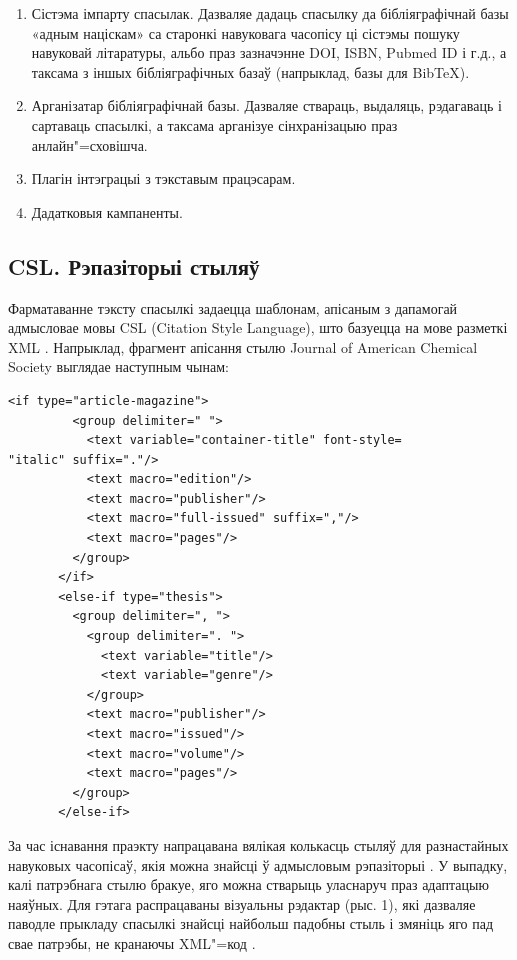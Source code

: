 \documentclass[10pt, a5paper]{article}
\begin{document}
\begin{enumerate}
  \item Сістэма імпарту спасылак. Дазваляе дадаць спасылку да бібліяграфічнай базы «адным націскам» са старонкі навуковага часопісу ці сістэмы пошуку навуковай літаратуры, альбо праз зазначэнне DOI, ISBN, Pubmed ID і г.д., а таксама з іншых бібліяграфічных базаў (напрыклад, базы для BibTeX).
  \item Арганізатар бібліяграфічнай базы. Дазваляе ствараць, выдаляць, рэдагаваць і сартаваць спасылкі, а таксама арганізуе сінхранізацыю праз анлайн"=сховішча.
  \item Плагін інтэграцыі з тэкставым працэсарам.
  \item Дадатковыя кампаненты.
\end{enumerate}

\subsection*{CSL. Рэпазіторыі стыляў}

Фарматаванне тэксту спасылкі задаецца шаблонам, апісаным з дапамогай адмысловае мовы CSL (Citation Style Language), што базуецца на мове разметкі XML \cite{Litvinenko1}. Напрыклад, фрагмент апісання стылю Journal of American Chemical Society выглядае наступным чынам:

\begin{verbatim}
<if type="article-magazine">
         <group delimiter=" ">
           <text variable="container-title" font-style=
"italic" suffix="."/>
           <text macro="edition"/>
           <text macro="publisher"/>
           <text macro="full-issued" suffix=","/>
           <text macro="pages"/>
         </group>
       </if>
       <else-if type="thesis">
         <group delimiter=", ">
           <group delimiter=". ">
             <text variable="title"/>
             <text variable="genre"/>
           </group>
           <text macro="publisher"/>
           <text macro="issued"/>
           <text macro="volume"/>
           <text macro="pages"/>
         </group>
       </else-if>
\end{verbatim}

За час існавання праэкту напрацавана вялікая колькасць стыляў для разнастайных навуковых часопісаў, якія можна знайсці ў адмысловым рэпазіторыі \cite{Litvinenko2}. У выпадку, калі патрэбнага стылю бракуе, яго можна стварыць уласнаруч праз адаптацыю наяўных. Для гэтага распрацаваны візуальны рэдактар (рыс. 1), які дазваляе паводле прыкладу спасылкі знайсці найбольш падобны стыль і змяніць яго пад свае патрэбы, не кранаючы XML"=код  \cite{Litvinenko3}.
\end{document}
